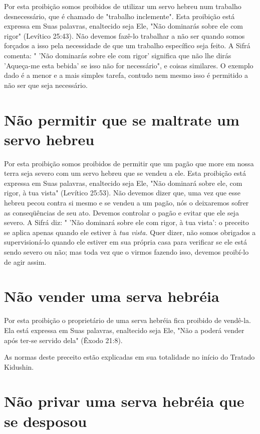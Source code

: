 \begin{itemize}
\begin{enumrate}
\begin{itemize}
\begin{itemize}
\begin{itemize}
Por esta proibição somos proibidos de utilizar um servo hebreu num
trabalho desnecessário, que é chamado de "trabalho inclemente". Esta
proibi­ção está expressa em Suas palavras, enaltecido seja Ele, "Não
dominarás sobre ele com rigor" (Levítico 25:43). Não devemos fazê-lo
trabalhar a não ser quan­do somos forçados a isso pela necessidade de
que um trabalho específico seja feito. A Sifrá comenta: " 'Não dominarás
sobre ele com rigor' significa que não lhe dirás 'Aqueça-me esta bebida'
se isso não for necessário", e coisas similares. O exemplo dado é a
menor e a mais simples tarefa, contudo nem mesmo isso é permitido a não
ser que seja necessário.

\section{Não permitir que se maltrate um servo hebreu}

Por esta proibição somos proibidos de permitir que um pagão que more em
nossa terra seja severo com um servo hebreu que se vendeu a ele. Esta
proibição está expressa em Suas palavras, enaltecido seja Ele, "Não
domi­nará sobre ele, com rigor, à tua vista" (Levítico 25:53). Não
devemos dizer que, uma vez que esse hebreu pecou contra si mesmo e se
vendeu a um pagão, nós o deixaremos sofrer as conseqüências de seu ato.
Devemos controlar o pagão e evitar que ele seja severo. A Sifrá diz: "
'Não dominará sobre ele com rigor, à tua vista': o preceito se aplica
apenas quando ele estiver à \emph{tua vista.} Quer dizer, não somos
obrigados a supervisioná-lo quando ele estiver em sua pró­pria casa para
verificar se ele está sendo severo ou não; mas toda vez que o virmos
fazendo isso, devemos proibí-lo de agir assim.


\section{Não vender uma serva hebréia}


Por esta proibição o proprietário de uma serva hebréia fica proibido de
vendê-la. Ela está expressa em Suas palavras, enaltecido seja Ele, "Não
a po­derá vender após ter-se servido dela" (Êxodo 21:8).

As normas deste preceito estão explicadas em sua totalidade no iní­cio
do Tratado Kidushin.

\section{Não privar uma serva hebréia que se desposou}


\end{itemize}
\end{itemize}
\end{itemize}
\end{enumrate}
\end{itemize}
